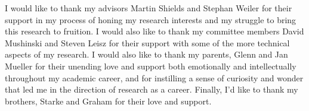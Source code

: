 		I would like to thank my advisors Martin Shields and Stephan Weiler for their support in my process of honing my research interests and my struggle to bring this research to fruition.  I would also like to thank my committee members David Mushinski and Steven Leisz for their support with some of the more technical aspects of my research.  I would also like to thank my parents, Glenn and Jan Mueller for their unending love and support both emotionally and intellectually throughout my academic career, and for instilling a sense of curiosity and wonder that led me in the direction of research as a career.  Finally, I'd like to thank my brothers, Starke and Graham for their love and support. 